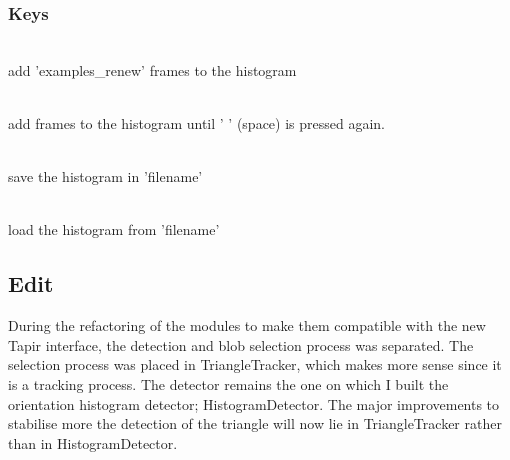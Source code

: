 \subsubsection{Keys}
\label{sec:ohd:howto:keys}
    \begin{description} \itemindent=-15pt
        \item['+'] \hfill \\ add 'examples\_renew' frames to the histogram
        \item[' ' (space)] \hfill \\ add frames to the histogram until ' ' (space) is pressed again.
        \item['s'] \hfill \\ save the histogram in 'filename'
        \item['l'] \hfill \\ load the histogram from 'filename' 
    \end{description}

\subsection{Edit}
\label{sec:ohd:edit}
During the refactoring of the modules to make them compatible with the new
Tapir interface, the detection and blob selection process was separated. The
selection process was placed in TriangleTracker, which makes more sense
since it is a tracking process. The detector remains the one on which I
built the orientation histogram detector; HistogramDetector. The major
improvements to stabilise more the detection of the triangle will now lie in
TriangleTracker rather than in HistogramDetector.

